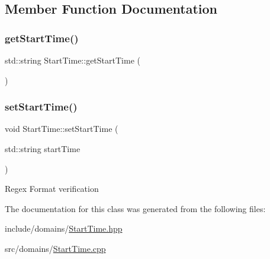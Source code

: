\subsection{Member Function Documentation}
\mbox{\label{class_start_time_a0a58ef81a90d0f58a7957e49dfa88684}} 
\subsubsection{\texorpdfstring{getStartTime()}{getStartTime()}}
{\footnotesize\ttfamily std\+::string Start\+Time\+::get\+Start\+Time (\begin{DoxyParamCaption}{ }\end{DoxyParamCaption})}

\mbox{\label{class_start_time_ad6692d66a7c97d3a58f6d7b5b56880bc}} 
\subsubsection{\texorpdfstring{setStartTime()}{setStartTime()}}
{\footnotesize\ttfamily void Start\+Time\+::set\+Start\+Time (\begin{DoxyParamCaption}\item[{std\+::string}]{start\+Time }\end{DoxyParamCaption})}

Regex Format verification 

The documentation for this class was generated from the following files\+:\begin{DoxyCompactItemize}
\item 
include/domains/\mbox{\hyperlink{_start_time_8hpp}{Start\+Time.\+hpp}}\item 
src/domains/\mbox{\hyperlink{_start_time_8cpp}{Start\+Time.\+cpp}}\end{DoxyCompactItemize}
